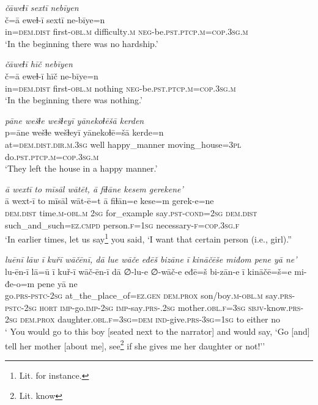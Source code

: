 \ea \label{ŽE.56}
\textit{čāweɫī sextī nebīyen} \\ 
\gll č=ā eweɫ-ī sextī ne-bīye=n \\ 
 in=\textsc{dem.dist} first\textsc{-obl}\textsc{.m} difficulty\textsc{.m} \textsc{neg-}be\textsc{.pst}\textsc{.ptcp}\textsc{.m}\textsc{=cop}\textsc{.3sg}\textsc{.m} \\ 
\glt `In the beginning there was no hardship.'
\z 
 
\ea \label{ŽE.57}
\textit{čāweɫī hīč nebīyen} \\ 
\gll č=ā eweɫ-ī hīč ne-bīye=n \\ 
 in=\textsc{dem.dist} first\textsc{-obl}\textsc{.m} nothing \textsc{neg-}be\textsc{.pst}\textsc{.ptcp}\textsc{.m}\textsc{=cop}\textsc{.3sg}\textsc{.m} \\ 
\glt `In the beginning there was nothing.'
\z 
 
\ea \label{ŽE.71}
\textit{pāne wešɫe wešɫeyī yānekoɫēšā kerden} \\ 
\gll p=āne wešɫe wešɫeyī yānekoɫē=šā kerde=n \\ 
 at=\textsc{dem.dist}\textsc{.dir}\textsc{.m}\textsc{.3sg} well happy\_manner moving\_house\textsc{=3pl} do\textsc{.pst}\textsc{.ptcp}\textsc{.m}\textsc{=cop}\textsc{.3sg}\textsc{.m} \\ 
\glt `They left the house in a happy manner.'
\z 
 
\ea \label{ŽE.73}
\textit{ā wextī to mīsāl wātēt, ā fiɫāne kesem gerekene’} \\ 
\gll ā wext-ī to mīsāl wāt-ē=t ā fiɫān=e kese=m gerek-e=ne \\ 
 \textsc{dem.dist} time\textsc{.m}\textsc{-obl}\textsc{.m} \textsc{2sg} for\_example say\textsc{.pst}\textsc{-cond}\textsc{=\textsc{2sg}} \textsc{dem.dist} such\_and\_such\textsc{=ez}\textsc{.cmpd} person\textsc{.f}\textsc{=\textsc{1sg}} necessary\textsc{-f}\textsc{=cop}\textsc{.3sg}\textsc{.f} \\ 
\glt `In earlier times, let us say\footnote{Lit. for instance.} you said, ‘I want that certain person (i.e., girl).''
\z 
 
\ea \label{ŽE.74}
\textit{luēnī lāw ī kuřī wāčēnī, dā lue wāče eđēš bizāne ī kināčēše miđom pene yā ne’} \\ 
\gll lu-ēn-ī lā=ū ī kuř-ī wāč-ēn-ī dā ∅-lu-e ∅-wāč-e eđē=š bi-zān-e ī kināčē=š=e mi-đe-o=m pene yā ne \\ 
 go\textsc{.prs}\textsc{-pstc}-\textsc{2sg} at\_the\_place\_of\textsc{\textsc{=ez.gen}} \textsc{dem.prox} son/boy\textsc{.m}\textsc{-obl}\textsc{.m} say\textsc{.prs}\textsc{-pstc}-\textsc{2sg} \textsc{hort} \textsc{imp-}go.\textsc{imp-}\textsc{2sg} \textsc{imp-}say\textsc{.prs-}.\textsc{2sg} mother\textsc{.obl}\textsc{.f}\textsc{=3sg} \textsc{sbjv-}know\textsc{.prs}-\textsc{2sg} \textsc{dem.prox} daughter\textsc{.obl}\textsc{.f}\textsc{=3sg}\textsc{=dem} \textsc{ind-}give\textsc{.prs}\textsc{-3sg}\textsc{=\textsc{1sg}} to either no \\ 
\glt ` You would go to this boy [seated next to the narrator] and would say, ‘Go [and] tell her mother [about me], see\footnote{Lit. know} if she gives me her daughter or not!’'
\z 
 
